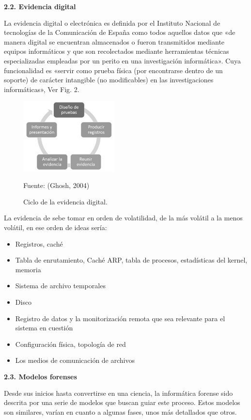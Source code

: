\documentclass[times,5p, twocolumn]{elsarticle}
\begin{document}
\textbf{2.2. Evidencia digital}

La evidencia digital o electrónica es
definida por el Instituto Nacional de tecnologías de la Comunicación de España
como todos aquellos datos que «de manera
digital se encuentran almacenados o fueron
transmitidos mediante equipos
informáticos y que son recolectados
mediante herramientas técnicas
especializadas empleadas por un perito en
una investigación informática». Cuya
funcionalidad es «servir como prueba
física (por encontrarse dentro de un
soporte) de carácter intangible (no
modificables) en las investigaciones
informáticas», Ver Fig. 2. 

\begin{figure}[h]
    \centering
    \includegraphics[width=5cm]{arti.png}
    \caption{Ciclo de la evidencia digital.  } Fuente: (Ghosh, 2004)
\end{figure}

La evidencia de sebe tomar en orden de
volatilidad, de la más volátil a la menos
volátil, en ese orden de ideas sería:

\begin{itemize}
    \item{Registros, caché} 
    \item{Tabla de enrutamiento, Caché ARP,
tabla de procesos, estadísticas del
kernel, memoria} 
    \item{Sistema de archivo temporales} 
    \item{Disco} 
    \item{Registro de datos y la monitorización
remota que sea relevante para el
sistema en cuestión} 
    \item{Configuración física, topología de
red} 
    \item{Los medios de comunicación de
archivos} 
\end{itemize}
\item 

\textbf{2.3. Modelos forenses}

Desde sus inicios hasta convertirse en una
ciencia, la informática forense sido descrita
por una serie de modelos que buscan guiar
este proceso. Estos modelos son similares,
varían en cuanto a algunas fases, unos más
detallados que otros.
\end{document}
